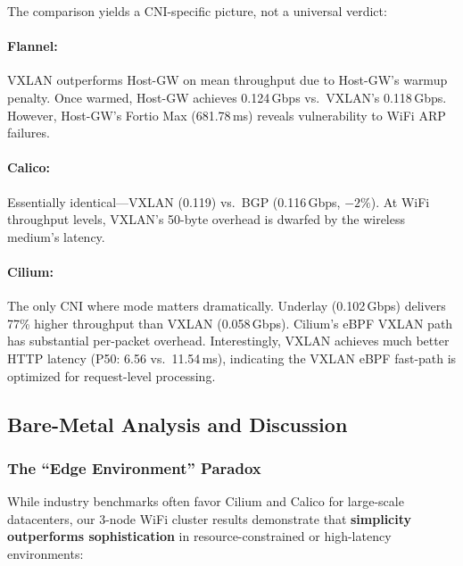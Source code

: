 \documentclass[11pt,a4paper]{article}
\begin{document}
\begin{findingbox}
The comparison yields a CNI-specific picture, not a universal verdict:

\paragraph{Flannel:} VXLAN outperforms Host-GW on mean throughput due to Host-GW's warmup penalty. Once warmed, Host-GW achieves 0.124\,Gbps vs.\ VXLAN's 0.118\,Gbps. However, Host-GW's Fortio Max (681.78\,ms) reveals vulnerability to WiFi ARP failures.

\paragraph{Calico:} Essentially identical---VXLAN (0.119) vs.\ BGP (0.116\,Gbps, $-2\%$). At WiFi throughput levels, VXLAN's 50-byte overhead is dwarfed by the wireless medium's latency.

\paragraph{Cilium:} The only CNI where mode matters dramatically. Underlay (0.102\,Gbps) delivers 77\% higher throughput than VXLAN (0.058\,Gbps). Cilium's eBPF VXLAN path has substantial per-packet overhead. Interestingly, VXLAN achieves much better HTTP latency (P50: 6.56 vs.\ 11.54\,ms), indicating the VXLAN eBPF fast-path is optimized for request-level processing.
\end{findingbox}



\subsection{Bare-Metal Analysis and Discussion}

\subsubsection{The ``Edge Environment'' Paradox}

While industry benchmarks often favor Cilium and Calico for large-scale datacenters, our 3-node WiFi cluster results demonstrate that \textbf{simplicity outperforms sophistication} in resource-constrained or high-latency environments:
\end{document}
